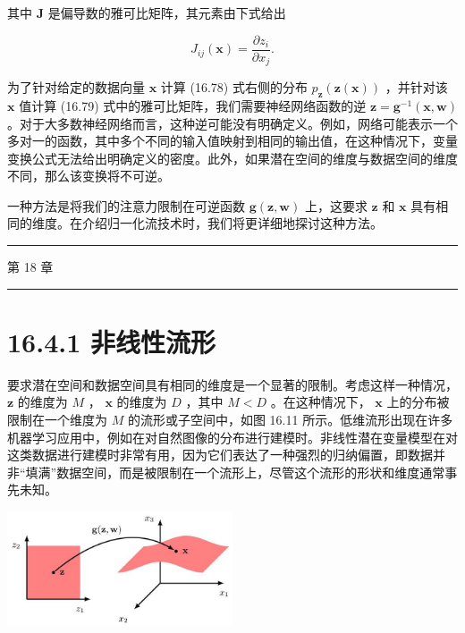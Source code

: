 \documentclass[10pt]{article}
\newcommand{\HRule}{\begin{center}\rule{0.9\linewidth}{0.2mm}\end{center}}
\begin{document}
其中 \(\mathbf{J}\) 是偏导数的雅可比矩阵，其元素由下式给出

\[
{J}_{ij}\left( \mathbf{x}\right)  = \frac{\partial {z}_{i}}{\partial {x}_{j}}. \tag{16.79}
\]

为了针对给定的数据向量 \(\mathbf{x}\) 计算 (16.78) 式右侧的分布 \({p}_{\mathbf{z}}\left( {\mathbf{z}\left( \mathbf{x}\right) }\right)\) ，并针对该 \(\mathbf{x}\) 值计算 (16.79) 式中的雅可比矩阵，我们需要神经网络函数的逆 \(\mathbf{z} = {\mathbf{g}}^{-1}\left( {\mathbf{x},\mathbf{w}}\right)\) 。对于大多数神经网络而言，这种逆可能没有明确定义。例如，网络可能表示一个多对一的函数，其中多个不同的输入值映射到相同的输出值，在这种情况下，变量变换公式无法给出明确定义的密度。此外，如果潜在空间的维度与数据空间的维度不同，那么该变换将不可逆。

一种方法是将我们的注意力限制在可逆函数 \(\mathbf{g}\left( {\mathbf{z},\mathbf{w}}\right)\) 上，这要求 \(\mathbf{z}\) 和 \(\mathbf{x}\) 具有相同的维度。在介绍归一化流技术时，我们将更详细地探讨这种方法。

\HRule

第 18 章

\HRule

\section*{16.4.1 非线性流形}

要求潜在空间和数据空间具有相同的维度是一个显著的限制。考虑这样一种情况， \(\mathbf{z}\) 的维度为 \(M\) ， \(\mathbf{x}\) 的维度为 \(D\) ，其中 \(M < D\) 。在这种情况下， \(\mathbf{x}\) 上的分布被限制在一个维度为 \(M\) 的流形或子空间中，如图 16.11 所示。低维流形出现在许多机器学习应用中，例如在对自然图像的分布进行建模时。非线性潜在变量模型在对这类数据进行建模时非常有用，因为它们表达了一种强烈的归纳偏置，即数据并非“填满”数据空间，而是被限制在一个流形上，尽管这个流形的形状和维度通常事先未知。

\begin{center}
\includegraphics[max width=0.5\textwidth]{images/0194e279-9b28-703a-88f4-c3ac21e2010d_542_876_352_669_340_0.jpg}
\end{center}
\hspace*{3em} 
\end{document}
